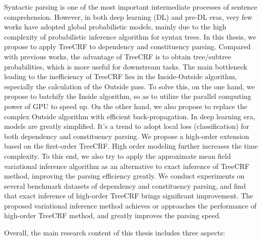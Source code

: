 
\begin{eabstract}
	Syntactic parsing is one of the most important intermediate processes of sentence comprehension.
	However, in both deep learning (DL) and pre-DL eras, very few works have adopted global probabilistic models, mainly due to the high complexity of probabilistic inference algorithm for syntax trees.
	In this thesis, we propose to apply TreeCRF to dependency and constituency parsing.
	Compared with previous works, the advantage of TreeCRF is to obtain tree/subtree probabilities, which is more useful for downstream tasks.
	The main bottleneck leading to the inefficiency of TreeCRF lies in the Inside-Outside algorithm, especially the calculation of the Outside pass.
	To solve this, on the one hand, we propose to batchify the Inside algorithm, so as to utilize the parallel computing power of GPU to speed up.
	On the other hand, we also propose to replace the complex Outside algorithm with efficient back-propagation.
	In deep learning era, models are greatly simplified.
	It's a trend to adopt local loss (classification) for both dependency and constituency parsing.
	We propose a high-order extension based on the first-order TreeCRF.
	High order modeling further increases the time complexity.
	To this end, we also try to apply the approximate mean field variational inference algorithm as an alternative to exact inference of TreeCRF method, improving the parsing efficiency greatly.
	We conduct experiments on several benchmark datasets of dependency and constituency parsing, and find that exact inference of high-order TreeCRF brings significant improvement.
	The proposed variational inference method achieves or approaches the performance of high-order TreeCRF method, and greatly improves the parsing speed.
	
	Overall, the main research content of this thesis includes three aspects:
	

\end{eabstract}
